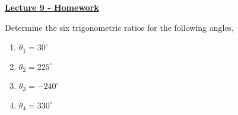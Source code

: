 \documentclass[12pt]{article} %
\begin{document}
	\renewcommand*{\coursecode}{MATH 235} %
	\renewcommand*{\assgnnumber}{Assignment 1} %
	\renewcommand*{\submdate}{September 14, 2021} %
	\renewcommand*{\studentfname}{Abdullah} %
	\renewcommand*{\studentlname}{Zubair} %
    \renewcommand*{\proofname}{Proof:}

	\renewcommand\qedsymbol{$\blacksquare$}
	\setfigpath
	\fancyhfoffset[L,O]{0pt} %




\begin{center}
	\textbf{\underline{\Huge{Lecture 9 - Homework}}}
\end{center}

\begin{qstn}
  Determine the six trigonometric ratios for the following angles,
  \begin{multicols}{4}
    \begin{enumerate}[label=(\alph*)]
      \item $\theta_1 = 30^{\circ}$
        \columnbreak
      \item $\theta_2 = 225^{\circ}$
        \columnbreak
      \item $\theta_3 = -240^{\circ}$
        \columnbreak
      \item $\theta_4 = 330^{\circ}$
    \end{enumerate}
    
  \end{multicols}

\end{qstn}
\end{document}
